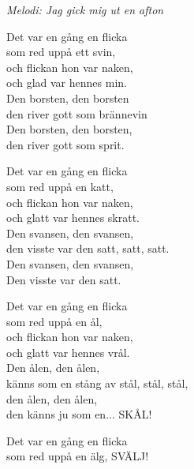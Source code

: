 {\footnotesize\textit{Melodi: Jag gick mig ut en afton}}\par
\vspace{10pt}
Det var en gång en flicka\\
som red uppå ett svin,\\
och flickan hon var naken,\\ 
och glad var hennes min.\\
Den borsten, den borsten\\
den river gott som brännevin\\
Den borsten, den borsten,\\
den river gott som sprit.\par
\vspace{8pt}
Det var en gång en flicka\\
som red uppå en katt,\\
och flickan hon var naken,\\ 
och glatt var hennes skratt.\\ 
Den svansen, den svansen,\\
den visste var den satt, satt, satt.\\ 
Den svansen, den svansen,\\
Den visste var den satt.\par
\vspace{8pt}
Det var en gång en flicka\\
som red uppå en ål,\\
och flickan hon var naken,\\ 
och glatt var hennes vrål.\\
Den ålen, den ålen,\\
känns som en stång av stål, stål, stål,\\ 
den ålen, den ålen,\\
den känns ju som en... SKÅL!\par
\vspace{8pt}
Det var en gång en flicka \\
som red uppå en älg, SVÄLJ!
